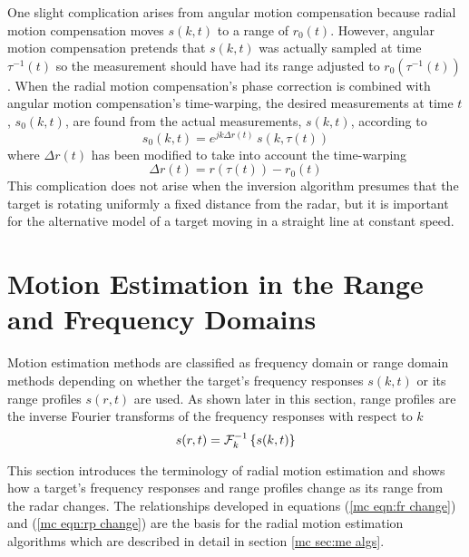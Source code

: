 One slight complication arises from angular motion compensation because
radial motion compensation moves $s(k,t)$ to a range of $r_0(t)$.  However,
angular motion compensation pretends that $s(k,t)$ was actually sampled at
time $\tau^{-1}(t)$ so the measurement should have had its range adjusted to
$r_0(\tau^{-1}(t))$.  
When the radial motion compensation's phase correction is combined with 
angular motion compensation's time-warping, the desired measurements at time
$t$, $s_0(k,t)$, are found from the actual measurements, $s(k,t)$, according
to
\begin{equation}
s_0\left(k,t\right)=e^{jk\Delta r(t)}\,s\left(k,\tau(t)\right)
\end{equation}
where $\Delta r(t)$ has been modified to take into account the time-warping
\begin{equation}
\Delta r(t)=r(\tau(t))-r_0(t)
\end{equation}
This complication does not arise when the inversion algorithm presumes that
the target is rotating uniformly a fixed distance from the radar, but it is
important for the alternative model of a target moving in a straight line at
constant speed.

\section{Motion Estimation in the Range and Frequency Domains}

Motion estimation methods are classified as frequency domain or range domain 
methods depending on whether the target's frequency responses $s(k,t)$ or its
range profiles $s(r,t)$ are used.  As shown later in this section, range
profiles are the inverse Fourier transforms of the frequency responses with
respect to $k$ 
\begin{equation}
s(r,t)={\cal F}^{-1}_k\left\{s(k,t)\right\}
\end{equation}

This section introduces the terminology of radial motion estimation and
shows how a target's frequency responses and range profiles change as its
range from the radar changes.  The relationships developed in equations 
(\ref{mc eqn:fr change}) and (\ref{mc eqn:rp change}) are the basis for
the radial motion estimation algorithms which are described in detail in
section \ref{mc sec:me algs}.

